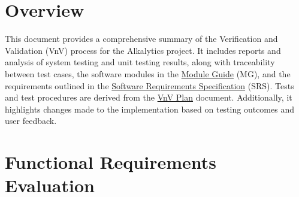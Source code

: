 \documentclass[12pt, titlepage]{article}
\begin{document}
\newpage

\tableofcontents

\listoftables %

\listoffigures %

\newpage


\section{Overview}
This document provides a comprehensive summary of the Verification and
Validation (VnV) process for the Alkalytics project. It includes reports and
analysis of system testing and unit testing results, along with traceability
between test cases, the software modules in the
\href{https://github.com/SumanyaG/Alkalytics/blob/main/docs/Design/MG.pdf}{Module
Guide} (MG), and the requirements outlined in the
\href{https://github.com/SumanyaG/Alkalytics/blob/main/docs/SRS/SRS.pdf}{Software
Requirements Specification} (SRS). Tests and test procedures are derived from the \href{https://github.com/SumanyaG/Alkalytics/blob/main/docs/VnVPlan/VnVPlan.pdf}{VnV Plan} document. Additionally, it highlights changes made to the
implementation based on testing outcomes and user feedback.

\section{Functional Requirements Evaluation}
\end{document}
